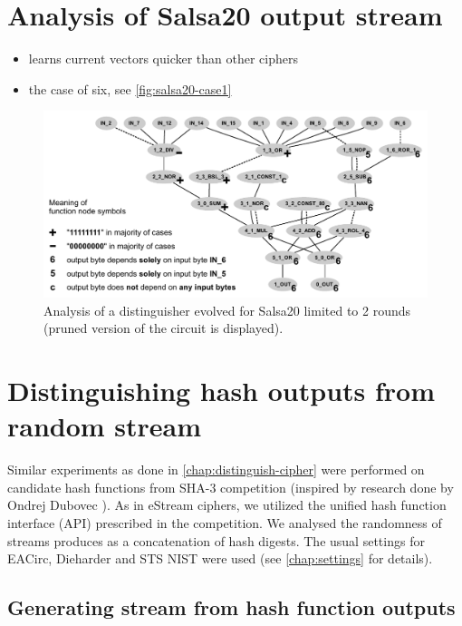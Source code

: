 \documentclass[12pt,oneside]{fithesis2}
\newcommand{\squarebullet}{\textcolor{black}{\raisebox{0.15em}{\rule{4pt}{4pt}}}}
\newenvironment{myItemize}{
  \begin{itemize}[leftmargin=2em,rightmargin=1em,itemsep=\parskip ,parsep=0em,topsep=0em,partopsep=0em]
  \renewcommand{\labelitemi}{\squarebullet}
  \renewcommand{\labelitemii}{$\diamond$}
}{
  \end{itemize}
}
\begin{document}
\chapter{Analysis of Salsa20 output stream}
\label{chap:analysis-salsa}
\begin{myItemize}
\item learns current vectors quicker than other ciphers
\item the case of six, see \autoref{fig:salsa20-case1}
\end{myItemize}

\begin{figure}[b!]
\centering
\includegraphics[width=\textwidth]{images/case1-final}
\caption{Analysis of a distinguisher evolved for Salsa20 limited to 2 rounds (pruned version of the circuit is displayed).}
\label{fig:salsa20-case1}
\end{figure}

\chapter{Distinguishing hash outputs from random stream}
\label{chap:distinguish-hash}

Similar experiments as done in \autoref{chap:distinguish-cipher} were performed on candidate hash functions from SHA-3 competition
\parencite{sha3-competition}
(inspired by research done by Ondrej Dubovec \parencite{thesis-dubovec}).
As in eStream ciphers, we utilized the unified hash function interface (API) prescribed in the competition.
We analysed the randomness of streams produces as a concatenation of hash digests.
The usual settings for EACirc, Dieharder and STS NIST were used (see \autoref{chap:settings} for details).

\section{Generating stream from hash function outputs}
\label{sec:hash-settings}
\end{document}
